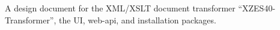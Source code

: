 A design document for the XML/XSLT document transformer ``XZES40-Transformer'', the UI, web-api, and installation packages.